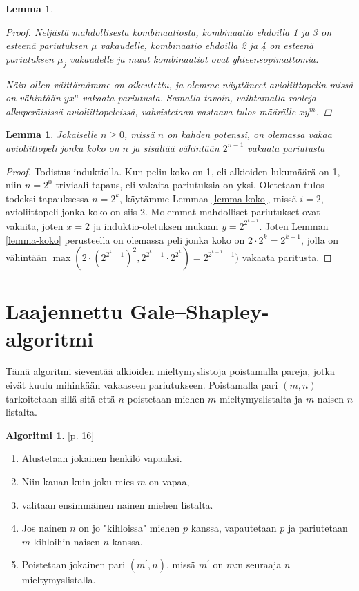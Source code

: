 \documentclass[finnish]{tktltiki2}
\newtheorem{lem}[lau]{Lemma}
\theoremstyle{definition}
\newtheorem{alg}[lau]{Algoritmi}
\theoremstyle{remark}
\begin{document}
\begin{lem}
\begin{proof}
Neljästä mahdollisesta kombinaatiosta, kombinaatio ehdoilla 1 ja 3 on esteenä pariutuksen $\mu$ vakaudelle, kombinaatio ehdoilla 2 ja 4 on esteenä pariutuksen $\mu_j$ vakaudelle ja muut kombinaatiot ovat yhteensopimattomia.

Näin ollen väittämämme on oikeutettu, ja olemme näyttäneet avioliittopelin missä on vähintään $yx^n$ vakaata pariutusta. Samalla tavoin, vaihtamalla rooleja alkuperäisissä avioliittopeleissä, vahvistetaan vastaava tulos määrälle $xy^m$.
\end{proof}
\end{lem}

\begin{lem}\cite[p. 24]{gusfield1989stable}
Jokaiselle $n \geq 0$, missä $n$ on kahden potenssi, on olemassa vakaa avioliittopeli jonka koko on $n$ ja sisältää vähintään $2^{n-1}$ vakaata pariutusta
\end{lem}
\begin{proof}
Todistus induktiolla. Kun pelin koko on 1, eli alkioiden lukumäärä on 1, niin $n = 2^0$ triviaali tapaus, eli vakaita pariutuksia on yksi. Oletetaan tulos todeksi tapauksessa $n = 2^k$, käytämme Lemmaa \ref{lemma-koko}, missä $i = 2$, avioliittopeli jonka koko on siis 2. Molemmat mahdolliset pariutukset ovat vakaita, joten $x = 2$ ja induktio-oletuksen mukaan $y = 2^{2^{k-1}}$. Joten Lemman \ref{lemma-koko} perusteella on olemassa peli jonka koko on $2 \cdot 2^k = 2^{k+1}$, jolla on vähintään $\max(2 \cdot (2^{2^{{k}}-1})^2, 2^{2^{k}-1} \cdot 2^{2^{k}}) = 2^{2^{k+1}-1})$ vakaata paritusta.
\end{proof}

\section{Laajennettu Gale--Shapley-algoritmi}
Tämä algoritmi sieventää alkioiden mieltymyslistoja poistamalla pareja, jotka eivät kuulu mihinkään vakaaseen pariutukseen. Poistamalla pari $(m, n)$ tarkoitetaan sillä sitä että $n$ poistetaan miehen $m$ mieltymyslistalta ja $m$ naisen $n$ listalta.

\begin{alg}\cite{gusfield1989stable}[p. 16]\label{alg2}
	\begin{enumerate}
		\item Alustetaan jokainen henkilö vapaaksi.
		\item Niin kauan kuin joku mies $m$ on vapaa,
		\item valitaan ensimmäinen nainen miehen listalta.
		\item Jos nainen $n$ on jo "kihloissa" miehen $p$ kanssa, vapautetaan $p$ ja pariutetaan $m$ kihloihin naisen $n$ kanssa.
		\item Poistetaan jokainen pari $(m^{'}, n)$, missä $m^{'}$ on $m$:n seuraaja $n$ mieltymyslistalla.
	\end{enumerate}
\end{alg}
\end{document}
